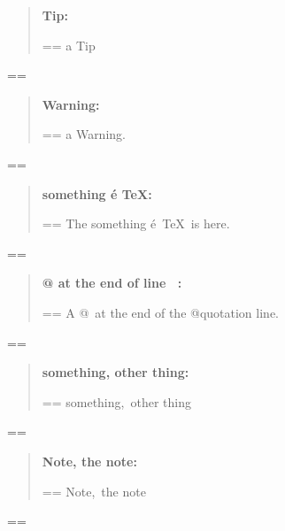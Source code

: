 \documentclass{book}
\makeatletter
\newenvironment{GNUTexinfopreformatted}{%
  \par\GNUTobeylines\obeyspaces\frenchspacing
  \parskip=\z@\parindent=\z@}{}
{\catcode`\^^M=13 \gdef\GNUTobeylines{\catcode`\^^M=13 \def^^M{\null\par}}}
\newenvironment{GNUTexinfoindented}
  {\begin{list}{}{}
  \item\relax}
  {\end{list}}
\makeatother
\begin{document}
\begin{GNUTexinfoindented}
\begin{quote}
\textbf{Tip:} \begin{GNUTexinfopreformatted}%
\ttfamily a Tip
\end{GNUTexinfopreformatted}
\end{quote}
\begin{GNUTexinfopreformatted}%
\ttfamily 
\end{GNUTexinfopreformatted}
\begin{quote}
\textbf{Warning:} \begin{GNUTexinfopreformatted}%
\ttfamily a Warning.
\end{GNUTexinfopreformatted}
\end{quote}
\begin{GNUTexinfopreformatted}%
\ttfamily 
\end{GNUTexinfopreformatted}
\begin{quote}
\textbf{something \'{e} \TeX{}:} \begin{GNUTexinfopreformatted}%
\ttfamily The something \'{e}\ \TeX{}\ is here.
\end{GNUTexinfopreformatted}
\end{quote}
\begin{GNUTexinfopreformatted}%
\ttfamily 
\end{GNUTexinfopreformatted}
\begin{quote}
\textbf{@ at the end of line \ {}:} \begin{GNUTexinfopreformatted}%
\ttfamily A @\ at the end of the @quotation line.
\end{GNUTexinfopreformatted}
\end{quote}
\begin{GNUTexinfopreformatted}%
\ttfamily 
\end{GNUTexinfopreformatted}
\begin{quote}
\textbf{something, other thing:} \begin{GNUTexinfopreformatted}%
\ttfamily something,\ other thing
\end{GNUTexinfopreformatted}
\end{quote}
\begin{GNUTexinfopreformatted}%
\ttfamily 
\end{GNUTexinfopreformatted}
\begin{quote}
\textbf{Note, the note:} \begin{GNUTexinfopreformatted}%
\ttfamily Note,\ the note
\end{GNUTexinfopreformatted}
\end{quote}
\begin{GNUTexinfopreformatted}%

\end{GNUTexinfopreformatted}
\end{GNUTexinfoindented}
\end{document}

